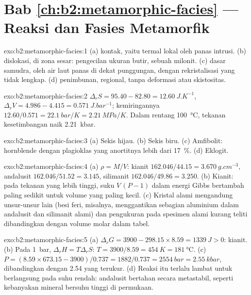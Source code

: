 \section*{Bab \ref{ch:b2:metamorphic-facies} --- Reaksi dan Fasies Metamorfik}

\begin{solution}{exo:b2:metamorphic-facies:1}
(a)  kontak, yaitu  termal lokal oleh panas intrusi.
(b)  dislokasi, di zona sesar: pengecilan ukuran butir, sebuah milonit.
(c)  dasar samudra, oleh air laut panas di dekat punggungan, dengan rekristalisasi
yang tidak lengkap. (d)  penimbunan, regional, tanpa deformasi atau
skistositas.
\end{solution}

\begin{solution}{exo:b2:metamorphic-facies:2}
$\Delta_r S = 95.40 - 82.80 = \qty{12.60}{J.K^{-1}}$, $\Delta_r V = 4.986 - 4.415 =
\qty{0.571}{J.bar^{-1}}$; kemiringannya $12.60/0.571 = \qty{22.1}{bar/K} = \qty{2.21}{MPa/K}$.
Dalam rentang \qty{100}{\celsius}, tekanan kesetimbangan naik \qty{2.21}{kbar}.
\end{solution}

\begin{solution}{exo:b2:metamorphic-facies:3}
(a) Sekis hijau. (b) Sekis biru. (c) Amfibolit: hornblende dengan plagioklas yang anortitnya lebih
dari \qty{17}{\percent}. (d) Eklogit.
\end{solution}

\begin{solution}{exo:b2:metamorphic-facies:4}
(a) $\rho = M/V$: kianit $162.046/44.15 = \qty{3.670}{g.cm^{-3}}$, andalusit
$162.046/51.52 = 3.145$, silimanit $162.046/49.86 = 3.250$. (b) Kianit: pada tekanan yang lebih
tinggi, suku $V\,(P - 1)$ dalam energi Gibbs bertambah paling sedikit untuk volume yang paling kecil.
(c) Kristal alami mengandung unsur-unsur lain (besi feri, misalnya, menggantikan sebagian
aluminium dalam andalusit dan silimanit alami) dan pengukuran pada spesimen
alami kurang teliti dibandingkan dengan volume molar dalam tabel.
\end{solution}

\begin{solution}{exo:b2:metamorphic-facies:5}
(a) $\Delta_r G = 3900 - 298.15\times8.59 = \qty{+1339}{J} > 0$: kianit. (b) Pada
\qty{1}{bar}, $\Delta_r H = T\Delta_r S$: $T = 3900/8.59 = \qty{454}{K} =
\qty{181}{\celsius}$. (c) $P = (8.59\times673.15 - 3900)/0.737 = 1882/0.737 =
\qty{2554}{bar} = \qty{2.55}{kbar}$, dibandingkan dengan 2.54 yang terukur. (d) Reaksi itu terlalu lambat
untuk berlangsung pada suhu rendah: andalusit bertahan secara metastabil, seperti kebanyakan mineral
bersuhu tinggi di permukaan.
\end{solution}

